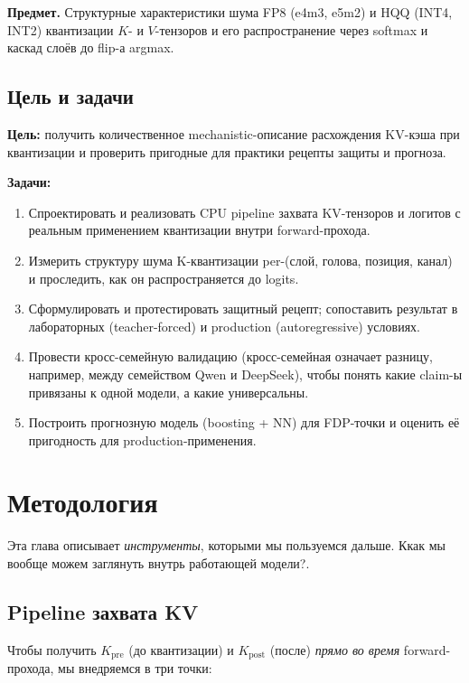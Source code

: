 \documentclass[a4paper,12pt]{article}
\begin{document}
\textbf{Предмет.} Структурные характеристики шума FP8 (e4m3, e5m2) и
HQQ (INT4, INT2) квантизации $K$- и $V$-тензоров и его распространение
через softmax и каскад слоёв до flip-а argmax.

\subsection{Цель и задачи}

\textbf{Цель:} получить количественное mechanistic-описание
расхождения KV-кэша при квантизации и проверить пригодные для практики
рецепты защиты и прогноза.

\textbf{Задачи:}
\begin{enumerate}[label=\arabic*.,leftmargin=*]
\item Спроектировать и реализовать CPU pipeline захвата KV-тензоров и
  логитов с реальным применением квантизации внутри forward-прохода.
\item Измерить структуру шума K-квантизации per-(слой, голова, позиция,
  канал) и проследить, как он распространяется до logits.
\item Сформулировать и протестировать защитный рецепт; сопоставить
  результат в лабораторных (teacher-forced) и production
  (autoregressive) условиях.
\item Провести кросс-семейную валидацию (кросс-семейная означает
  разницу, например, между семейством Qwen и DeepSeek), чтобы понять
  какие claim-ы привязаны к одной модели, а какие универсальны.
\item Построить прогнозную модель (boosting + NN) для FDP-точки и
  оценить её пригодность для production-применения.
\end{enumerate}

\section{Методология}

Эта глава описывает \textit{инструменты}, которыми мы пользуемся
дальше. Ккак мы вообще можем заглянуть внутрь работающей
модели?.

\subsection{Pipeline захвата KV}

Чтобы получить $K_\text{pre}$ (до квантизации) и $K_\text{post}$ (после)
\textit{прямо во время} forward-прохода, мы внедряемся в три точки:
\end{document}
